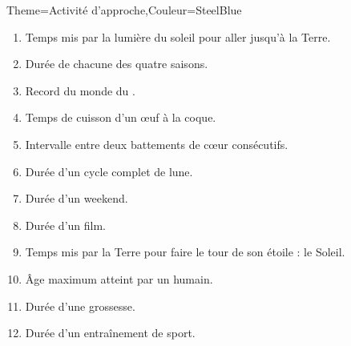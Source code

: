 \begin{Maquette}[Cours]{Theme={Activité d'approche},Couleur={SteelBlue}}
\begin{AActivite}
            \begin{multicols}{2}
               {\singlespacing
               \begin{enumerate}[label=\Alph*.]
                  \item Temps mis par la lumière du soleil pour aller jusqu'à la Terre.
                  \item Durée de chacune des quatre saisons.
                  \item Record du monde du .
                  \item Temps de cuisson d'un \oe uf à la coque.
                  \item Intervalle entre deux battements de c\oe ur consécutifs.
                  \item Durée d'un cycle complet de lune.
                  \item Durée d'un weekend.
                  \item Durée d'un film.
                  \item Temps mis par la Terre pour faire le tour de son étoile : le Soleil.
                  \item Âge maximum atteint par un humain.
                  \item Durée d'une grossesse.
                  \item Durée d'un entraînement de sport.
               \end{enumerate}}
            \end{multicols}
            \begin{center}
            \end{center}

      \end{AActivite}

\end{Maquette}


